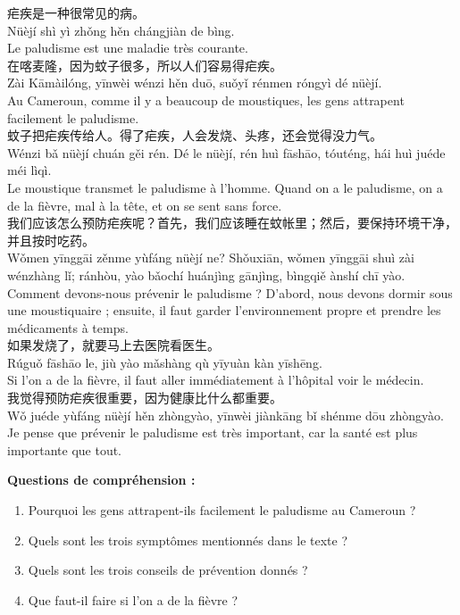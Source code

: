 \documentclass[11pt]{article}
\begin{document}
\begin{textebox}
疟疾是一种很常见的病。\\
Nüèjí shì yì zhǒng hěn chángjiàn de bìng.\\
Le paludisme est une maladie très courante.\\[4pt]
在喀麦隆，因为蚊子很多，所以人们容易得疟疾。\\
Zài Kāmàilóng, yīnwèi wénzi hěn duō, suǒyǐ rénmen róngyì dé nüèjí.\\
Au Cameroun, comme il y a beaucoup de moustiques, les gens attrapent facilement le paludisme.\\[4pt]
蚊子把疟疾传给人。得了疟疾，人会发烧、头疼，还会觉得没力气。\\
Wénzi bǎ nüèjí chuán gěi rén. Dé le nüèjí, rén huì fāshāo, tóuténg, hái huì juéde méi lìqì.\\
Le moustique transmet le paludisme à l'homme. Quand on a le paludisme, on a de la fièvre, mal à la tête, et on se sent sans force.\\[4pt]
我们应该怎么预防疟疾呢？首先，我们应该睡在蚊帐里；然后，要保持环境干净，并且按时吃药。\\
Wǒmen yīnggāi zěnme yùfáng nüèjí ne? Shǒuxiān, wǒmen yīnggāi shuì zài wénzhàng lǐ; ránhòu, yào bǎochí huánjìng gānjìng, bìngqiě ànshí chī yào.\\
Comment devons-nous prévenir le paludisme ? D'abord, nous devons dormir sous une moustiquaire ; ensuite, il faut garder l'environnement propre et prendre les médicaments à temps.\\[4pt]
如果发烧了，就要马上去医院看医生。\\
Rúguǒ fāshāo le, jiù yào mǎshàng qù yīyuàn kàn yīshēng.\\
Si l'on a de la fièvre, il faut aller immédiatement à l'hôpital voir le médecin.\\[4pt]
我觉得预防疟疾很重要，因为健康比什么都重要。\\
Wǒ juéde yùfáng nüèjí hěn zhòngyào, yīnwèi jiànkāng bǐ shénme dōu zhòngyào.\\
Je pense que prévenir le paludisme est très important, car la santé est plus importante que tout.
\end{textebox}

\textbf{Questions de compréhension :}
\begin{enumerate}
  \item Pourquoi les gens attrapent-ils facilement le paludisme au Cameroun ?
  \item Quels sont les trois symptômes mentionnés dans le texte ?
  \item Quels sont les trois conseils de prévention donnés ?
  \item Que faut-il faire si l'on a de la fièvre ?
\end{enumerate}
\end{document}
